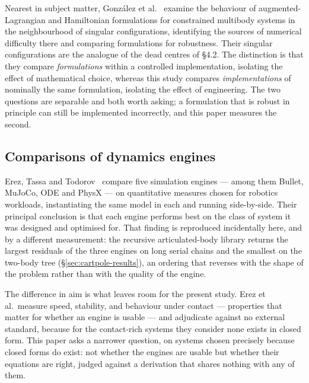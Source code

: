 \documentclass[review,12pt]{elsarticle}
\begin{document}
Nearest in subject matter, Gonz\'alez et al.~\cite{gonzalez2016} examine the
behaviour of augmented-Lagrangian and Hamiltonian formulations for constrained
multibody systems in the neighbourhood of singular configurations, identifying
the sources of numerical difficulty there and comparing formulations for
robustness. Their singular configurations are the analogue of the dead centres of
\S4.2. The distinction is that they compare \emph{formulations} within a
controlled implementation, isolating the effect of mathematical choice, whereas
this study compares \emph{implementations} of nominally the same formulation,
isolating the effect of engineering. The two questions are separable and both
worth asking; a formulation that is robust in principle can still be implemented
incorrectly, and this paper measures the second.

\subsection{Comparisons of dynamics engines}
Erez, Tassa and Todorov~\cite{erez2015} compare five simulation engines --- among
them Bullet, MuJoCo, ODE and PhysX --- on quantitative measures chosen for
robotics workloads, instantiating the same model in each and running side-by-side.
Their principal conclusion is that each engine performs best on the class of
system it was designed and optimised for. That finding is reproduced
incidentally here, and by a different measurement: the recursive
articulated-body library returns the largest residuals of the three engines on
long serial chains and the smallest on the two-body tree
(\S\ref{sec:cartpole-results}), an ordering that reverses with the shape of the
problem rather than with the quality of the engine.

The difference in aim is what leaves room for the present study. Erez et al.\
measure speed, stability, and behaviour under contact --- properties that matter
for whether an engine is usable --- and adjudicate against no external standard,
because for the contact-rich systems they consider none exists in closed form.
This paper asks a narrower question, on systems chosen precisely because closed
forms do exist: not whether the engines are usable but whether their equations
are right, judged against a derivation that shares nothing with any of them.
\end{document}
